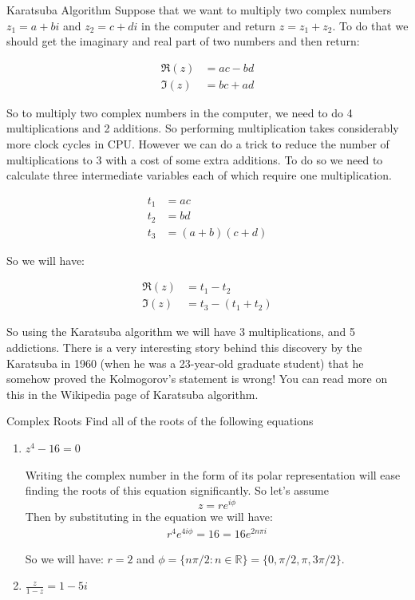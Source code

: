 \begin{example}{Karatsuba Algorithm}
Suppose that we want to multiply two complex numbers $z_1 = a + bi$ and $ z_2 = c + di$ in the computer and return $z = z_1 + z_2$. To do that we should get the imaginary and real part of two numbers and then return:

\begin{align*}
\Re (z) &= ac - bd \\
\Im (z) &= bc + ad
\end{align*}

So to multiply two complex numbers in the computer, we need to do 4 multiplications and 2 additions. So performing multiplication takes considerably more clock cycles in CPU. However we can do a trick to reduce the number of multiplications to 3 with a cost of some extra additions. To do so we need to calculate three intermediate variables each of which require one multiplication.

\begin{align*}
t_1 &= ac \\
t_2 &= bd \\
t_3 &= (a+b)(c+d)
\end{align*}

So we will have:

\begin{align*}
\Re (z) &= t_1 - t_2 \\
\Im (z) &= t_3 - (t_1 + t_2)
\end{align*}

So using the Karatsuba algorithm we will have 3 multiplications, and 5 addictions. There is a very interesting story behind this discovery by the Karatsuba in 1960 (when he was a 23-year-old graduate student) that he somehow proved the Kolmogorov's statement is wrong! You can read more on this in the Wikipedia page of Karatsuba algorithm.   

\end{example}

\begin{example}{Complex Roots}
Find all of the roots of the following equations

\begin{enumerate}
\item $z^4 -16 = 0$

\begin{sol}
Writing the complex number in the form of its polar representation will ease finding the roots of this equation significantly. So let's assume \[ z = r e^{i\phi} \]
Then by substituting in the equation we will have:
\begin{align*}
r^4 e^{4i\phi} = 16 = 16 e^{2n\pi i}
\end{align*}

So we will have: $r = 2$ and $\phi = \{ n \pi /2: n \in \mathbb{R} \} = \{ 0, \pi/2, \pi, 3\pi/2 \}$.

\end{sol}



\item $\frac{z}{1-z} = 1-5i$
\end{enumerate}


\end{example}

